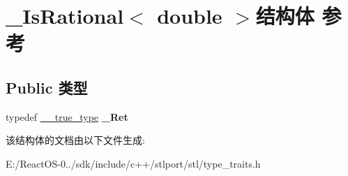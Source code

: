 \hypertarget{struct___is_rational_3_01double_01_4}{}\section{\+\_\+\+Is\+Rational$<$ double $>$结构体 参考}
\label{struct___is_rational_3_01double_01_4}
\subsection*{Public 类型}
\begin{DoxyCompactItemize}
\item 
\mbox{\label{struct___is_rational_3_01double_01_4_a38838d9a3e5b173d5a9eaaefa77da604}} 
typedef \hyperlink{struct____true__type}{\+\_\+\+\_\+true\+\_\+type} {\bfseries \+\_\+\+Ret}
\end{DoxyCompactItemize}


该结构体的文档由以下文件生成\+:\begin{DoxyCompactItemize}
\item 
E\+:/\+React\+O\+S-\/0../sdk/include/c++/stlport/stl/type\+\_\+traits.\+h\end{DoxyCompactItemize}
